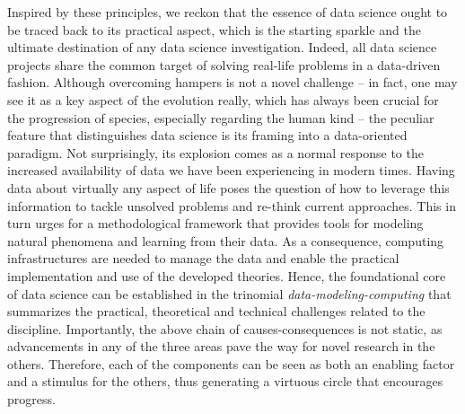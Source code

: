 Inspired by these principles, we reckon that the essence of data science ought to be traced back to its practical aspect, which is the starting sparkle and the ultimate destination of any data science investigation.
Indeed, all data science projects share the common target of solving real-life problems in a data-driven fashion.
Although overcoming hampers is not a novel challenge -- in fact, one may see it as a key aspect of the evolution really, which has always been crucial for the progression of species, especially regarding the human kind -- the peculiar feature that distinguishes data science is its framing into a data-oriented paradigm.
Not surprisingly, its explosion comes as a normal response to the increased availability of data we have been experiencing in modern times.
Having data about virtually any aspect of life poses the question of how to leverage this information to tackle unsolved problems and re-think current approaches.
This in turn urges for a methodological framework that provides tools for modeling natural phenomena and learning from their data.
As a consequence, computing infrastructures are needed to manage the data and enable the practical implementation and use of the developed theories.
Hence, the foundational core of data science can be established in the trinomial \textit{\mbox{data-modeling-computing}} that summarizes the practical, theoretical and technical challenges related to the discipline.
Importantly, the above chain of causes-consequences is not static, as advancements in any of the three areas pave the way for novel research in the others. 
Therefore, each of the components can be seen as both an enabling factor and a stimulus for the others, thus generating a virtuous circle that encourages progress.

